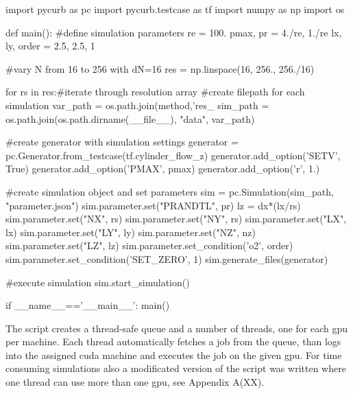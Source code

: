 \begin{python}[caption='Grid Convergence Study Example']
import pycurb as pc
import pycurb.testcase as tf
import numpy as np
import os

def main():
    #define simulation parameters
    re = 100.
    pmax, pr = 4./re,  1./re
    lx, ly, order = 2.5, 2.5, 1

    #vary N from 16 to 256 with dN=16
    res = np.linspace(16, 256., 256./16)

    for rs in res:#iterate through resolution array
        #create filepath for each simulation
        var_path = os.path.join(method,'res_%
        sim_path = os.path.join(os.path.dirname(__file__), "data", var_path)

        #create generator with simulation settings
        generator = pc.Generator.from_testcase(tf.cylinder_flow_z)
        generator.add_option('SETV', True)
        generator.add_option('PMAX', pmax)
        generator.add_option('r', 1.)

        #create simulation object and set parameters
        sim = pc.Simulation(sim_path, "parameter.json")
        sim.parameter.set("PRANDTL", pr)
        lz = dx*(lx/rs)
        sim.parameter.set("NX", rs)
        sim.parameter.set("NY", rs)
        sim.parameter.set("LX", lx)
        sim.parameter.set("LY", ly)
        sim.parameter.set("NZ", nz)
        sim.parameter.set("LZ", lz)
        sim.parameter.set_condition('o2', order)
        sim.parameter.set_condition('SET_ZERO', 1)
        sim.generate_files(generator)

        #execute simulation
        sim.start_simulation()

if __name__=='__main__':
    main()
\end{python}

The script creates a thread-safe queue and a number of threads, one for each gpu per machine.
Each thread automatically fetches a job from the queue, than logs into the assigned cuda machine
and executes the job on the given gpu.
For time consuming simulations also a modificated version of the script was written where one thread
can use more than one gpu, see Appendix A(XX).
